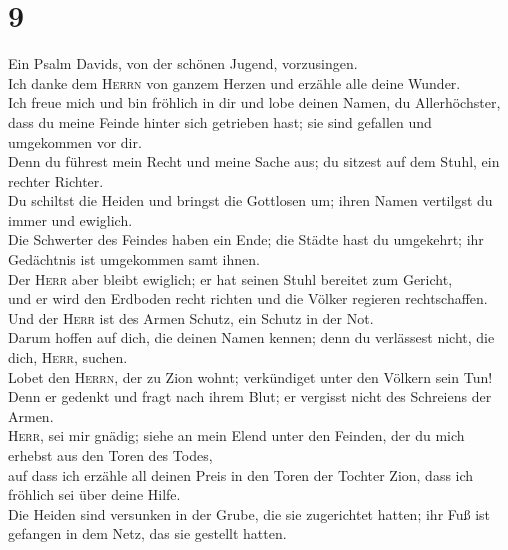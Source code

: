 \hypertarget{section-8}{%
\section{9}\label{section-8}}

 Ein Psalm Davids, von der schönen Jugend, vorzusingen.\\
 Ich danke dem \textsc{Herrn} von ganzem Herzen und
erzähle alle deine Wunder.\\
 Ich freue mich und bin fröhlich in dir und lobe deinen
Namen, du Allerhöchster,\\
 dass du meine Feinde hinter sich getrieben hast; sie sind
gefallen und umgekommen vor dir.\\
 Denn du führest mein Recht und meine Sache aus; du
sitzest auf dem Stuhl, ein rechter Richter.\\
 Du schiltst die Heiden und bringst die Gottlosen um;
ihren Namen vertilgst du immer und ewiglich.\\
 Die Schwerter des Feindes haben ein Ende; die Städte hast
du umgekehrt; ihr Gedächtnis ist umgekommen samt ihnen.\\
 Der \textsc{Herr} aber bleibt ewiglich; er hat seinen
Stuhl bereitet zum Gericht,\\
 und er wird den Erdboden recht richten und die Völker
regieren rechtschaffen.\\
 Und der \textsc{Herr} ist des Armen Schutz, ein Schutz
in der Not.\\
 Darum hoffen auf dich, die deinen Namen kennen; denn du
verlässest nicht, die dich, \textsc{Herr}, suchen.\\
 Lobet den \textsc{Herrn}, der zu Zion wohnt; verkündiget
unter den Völkern sein Tun!\\
 Denn er gedenkt und fragt nach ihrem Blut; er vergisst
nicht des Schreiens der Armen.\\
 \textsc{Herr}, sei mir gnädig; siehe an mein Elend unter
den Feinden, der du mich erhebst aus den Toren des Todes,\\
 auf dass ich erzähle all deinen Preis in den Toren der
Tochter Zion, dass ich fröhlich sei über deine Hilfe.\\
 Die Heiden sind versunken in der Grube, die sie
zugerichtet hatten; ihr Fuß ist gefangen in dem Netz, das sie gestellt
hatten.\\
